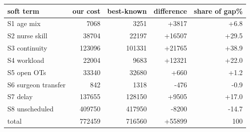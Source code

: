\begin{center}\small
\begin{tabular}{@{}l r r r r@{}}
\toprule
soft term & our cost & best-known & difference & share of gap\%\\
\midrule
S1 age mix & 7068 & 3251 & +3817 & +6.8\\
S2 nurse skill & 38704 & 22197 & +16507 & +29.5\\
S3 continuity & 123096 & 101331 & +21765 & +38.9\\
S4 workload & 22004 & 9683 & +12321 & +22.0\\
S5 open OTs & 33340 & 32680 & +660 & +1.2\\
S6 surgeon transfer & 842 & 1318 & -476 & -0.9\\
S7 delay & 137655 & 128150 & +9505 & +17.0\\
S8 unscheduled & 409750 & 417950 & -8200 & -14.7\\
\midrule
total & 772459 & 716560 & +55899 & 100\\
\bottomrule
\end{tabular}
\end{center}